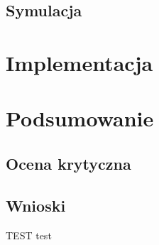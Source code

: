 \documentclass{article}
\begin{document}
\subsection{Symulacja}
\newpage
\section{Implementacja}
\newpage
\section{Podsumowanie}
\subsection{Ocena krytyczna}

\subsection{Wnioski}
\par TEST \cite{ug230} \cite{wave} \cite{zsk} test
\newpage




\end{document}
